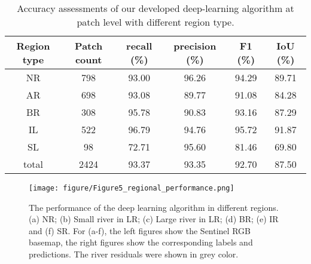 \documentclass[preprint,12pt,authoryear]{elsarticle}
\begin{document}
\begin{table}[t]
    \centering
    \caption{Accuracy assessments of our developed deep-learning algorithm at patch level with different region type.}\label{tabel1}
    \begin{tabular}{cccccc}
    \toprule
    Region type & Patch count & recall (\%)	& precision (\%) & F1 (\%) & IoU (\%) \\
    \midrule
    NR & 798 & 93.00 & 96.26 & 94.29 & 89.71 \\
    AR & 698 & 93.08 & 89.77 & 91.08 & 84.28 \\
    BR & 308 & 95.78 & 90.83 & 93.16 & 87.29 \\
    IL & 522 & 96.79 & 94.76 & 95.72 & 91.87 \\
    SL & 98 & 72.71 & 95.60 & 81.46 & 69.80 \\
    total & 2424 & 93.37 & 93.35 & 92.70 & 87.50 \\
    \bottomrule
    \end{tabular}
    
\end{table}

\begin{figure}[h]
    \centering
    \texttt{[image: figure/Figure5\_regional\_performance.png]}
    \caption{The performance of the deep learning algorithm in different regions. (a) NR; (b) Small river in LR; (c) Large river in LR; (d) BR; (e) IR and (f) SR. For (a-f), the left figures show the Sentinel RGB basemap, the right figures show the corresponding labels and predictions. The river residuals were shown in grey color.}
    \label{fig:Fig5}
\end{figure}
\end{document}
